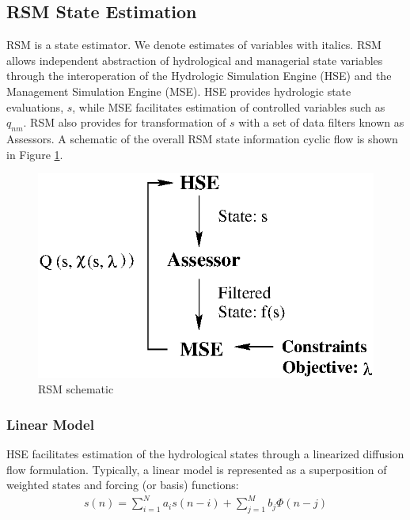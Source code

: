 \subsection{RSM State Estimation}

RSM is a state estimator. We denote estimates of variables with
italics. RSM allows independent abstraction of hydrological and
managerial state variables through the interoperation of the
Hydrologic Simulation Engine (HSE) and the Management Simulation
Engine (MSE). HSE provides hydrologic state evaluations, $s$, while
MSE facilitates estimation of controlled variables such as
$q_{nm}$. RSM also provides for transformation of $s$ with a set of
data filters known as Assessors. A schematic of the overall RSM state
information cyclic flow is shown in Figure \ref{fig:rsmSchematic}.

\begin{figure}
 \begin{center}
  \includegraphics[scale=.75]{Graphics/rsmSchematic.eps}
 \end{center}
 \caption{\label{fig:rsmSchematic}  RSM schematic}
\end{figure}
 
\subsubsection{Linear Model}

HSE facilitates estimation of the hydrological states through a
linearized diffusion flow formulation. Typically, a linear model is
represented as a superposition of weighted states and forcing (or
basis) functions:
\begin{align}\label{eqn:linearModel}
  s(n) = \sum_{i=1}^{N}a_is(n-i) + \sum_{j=1}^Mb_j\Phi(n-j)
\end{align}

